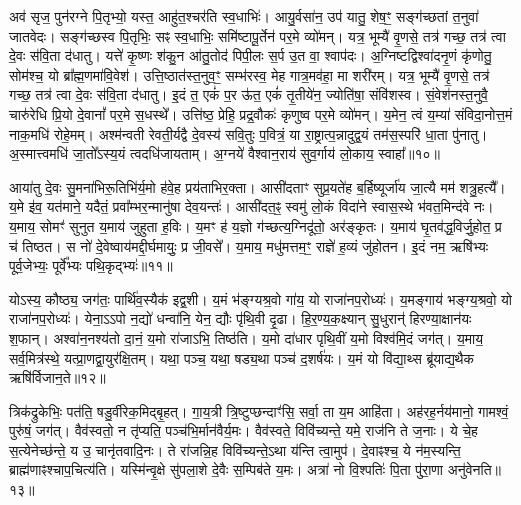 अव॑ सृज॒ पुन॑रग्ने पि॒तृभ्यो॒ यस्त॒ आहु॑त॒श्चर॑ति स्व॒धाभिः॑। 
आयु॒र्वसा॑न॒ उप॑ यातु॒ शेष॒ꣳ॒ सङ्ग॑च्छतां त॒नुवा॑ जातवेदः। 
सङ्ग॑च्छस्व पि॒तृभिः॒ सꣴ स्व॒धाभिः॒ समि॑ष्टापू॒र्तेन॑ पर॒मे व्यो॑मन्। 
यत्र॒ भूम्यै॑ वृ॒णसे॒ तत्र॑ गच्छ॒ तत्र॑ त्वा दे॒वः स॑वि॒ता द॑धातु। 
यत्ते॑ कृ॒ष्णः  श॑कु॒न आ॑तु॒तोद॑ पिपी॒लः स॒र्प उ॒त वा॒ श्वाप॑दः। 
अ॒ग्निष्टद्विश्वा॑दनृ॒णं कृ॑णोतु॒ सोम॑श्च॒ यो ब्रा᳚ह्म॒णमा॑वि॒वेश॑। 
उत्ति॒ष्ठात॑स्त॒नुव॒ꣳ॒ सम्भ॑रस्व॒ मेह गात्र॒मव॑हा॒ मा शरी॑रम्। 
यत्र॒ भूम्यै॑ वृ॒णसे॒ तत्र॑ गच्छ॒ तत्र॑ त्वा दे॒वः स॑वि॒ता द॑धातु। 
इ॒दं त॒ एकं॑ प॒र ऊ॑त॒ एकं॑ तृ॒तीये॑न॒ ज्योति॑षा॒ संवि॑शस्व। 
सं॒वेश॑नस्त॒नुवै॒ चारु॑रेधि प्रि॒यो दे॒वानां᳚ पर॒मे स॒धस्थे᳚। 
उत्ति॑ष्ठ॒ प्रेहि॒ प्रद्र॒वौकः॑ कृणुष्व पर॒मे व्यो॑मन्। 
य॒मेन॒ त्वं य॒म्या॑ संविदा॒नोत्त॒मं नाक॒मधि॑ रोहे॒मम्। 
अश्म॑न्वती रेवती॒र्यद्वै दे॒वस्य॑ सवि॒तुः प॒वित्रं॒ या रा॒ष्ट्रात्प॒न्नादुद्व॒यं तम॑स॒स्परि॑ धा॒ता पु॑नातु। 
अ॒स्मात्त्वमधि॑ जा॒तो᳚ऽस्य॒यं त्वदधि॑जायताम्। 
अ॒ग्नये॑ वैश्वान॒राय॑ सुव॒र्गाय॑ लो॒काय॒ स्वाहा᳚॥१०॥
\anuvakamend[अव॑शीयताꣳ स॒धस्थे॒ पञ्च॑ च]

आया॑तु दे॒वः सु॒मना॑भिरू॒तिभि॑र्य॒मो ह॑वे॒ह प्रय॑ताभिर॒क्ता। 
आसी॑दताꣳ सुप्र॒यते॑ह ब॒र्\mbox{}हिष्यूर्जा॑य जा॒त्यै मम॑ शत्रु॒हत्यै᳚। 
य॒मे इ॑व॒ यत॑माने॒ यदैतं॒ प्रवा᳚म्भर॒न्मानु॑षा देव॒यन्तः॑। 
आसी॑दत॒ꣴ॒ स्वमु॑ लो॒कं  विदा॑ने स्वास॒स्थे भ॑वत॒मिन्द॑वे नः। 
य॒माय॒ सोमꣳ॑ सुनुत य॒माय॑ जुहुता ह॒विः। 
य॒मꣳ ह॑ य॒ज्ञो ग॑च्छत्य॒ग्निदू॑तो॒ अर॑ङ्कृतः। 
य॒माय॑ घृ॒तव॑द्ध॒विर्जु॒होत॒ प्र च॑ तिष्ठत। 
स नो॑ दे॒वेष्वाय॑मद्दी॒र्घमायुः॒ प्र जी॒वसे᳚। 
य॒माय॒ मधु॑मत्तम॒ꣳ॒ राज्ञे॑ ह॒व्यं जु॑होतन। 
इ॒दं नम॒ ऋषि॑भ्यः पूर्व॒जेभ्यः॒ पूर्वे᳚भ्यः पथि॒कृद्भ्यः॑॥११॥

योऽस्य॒ कौष्ठ्य॒ जग॑तः॒ पार्थि॑व॒स्यैक॑ इद्व॒शी। 
य॒मं भ॑ङ्ग्यश्र॒वो गा॑य॒ यो राजा॑नप॒रोध्यः॑। 
य॒मङ्गाय॑ भङ्ग्य॒श्रवो॒ यो राजा॑नप॒रोध्यः॑। 
येना॒ऽऽपो न॒द्यो॑ धन्वा॑नि॒ येन॒ द्यौः पृ॑थि॒वी दृ॒ढा। 
हि॒र॒ण्य॒क॒क्ष्यान् सु॒धुरान्॑ हिरण्या॒क्षान॑यः  श॒फान्। 
अश्वा॑न॒नश्य॑तो दा॒नं॒ य॒मो रा॑जाऽभि॒ तिष्ठ॑ति। 
य॒मो दा॑धार पृथि॒वीं य॒मो विश्व॑मि॒दं जग॑त्। 
य॒माय॒ सर्व॒मित्र॑स्थे॒ यत्प्रा॒णद्वा॒युर॑क्षि॒तम्। 
यथा॒ पञ्च॒ यथा॒ षड्य॒था पञ्च॑ द॒शर्\mbox{}ष॑यः। 
य॒मं यो वि॑द्या॒थ्स ब्रू॑याद्य॒थैक ऋषि॑र्विजान॒ते॥१२॥

त्रिक॑द्रुकेभिः॒ पत॑ति॒ षडु॒र्वीरेक॒मिद्बृ॒हत्। 
गा॒य॒त्री त्रि॒ष्टुप्छन्दाꣳ॑सि॒ सर्वा॒ ता य॒म आहि॑ता। 
अह॑रह॒र्नय॑मानो॒ गामश्वं॒ पुरु॑षं॒ जग॑त्। 
वैव॑स्वतो॒ न तृ॑प्यति॒ पञ्च॑भि॒र्मान॑वैर्य॒मः। 
वैव॑स्वते॒ विवि॑च्यन्ते॒ यमे॒ राज॑नि ते ज॒नाः। 
ये चे॒ह स॒त्येनेच्छ॑न्ते॒ य उ॒ चानृ॑तवादि॒नः। 
ते रा॑जन्नि॒ह विवि॑च्यन्ते॒ऽथा य॑न्ति त्वा॒मुप॑। 
दे॒वाꣴश्च॒ ये न॑म॒स्यन्ति॒ ब्राह्म॑णाꣴश्चाप॒चित्य॑ति। 
यस्मि॑न्वृ॒क्षे सु॑पला॒शे दे॒वैः स॒म्पिब॑ते य॒मः। 
अत्रा॑ नो वि॒श्पतिः॑ पि॒ता पु॑रा॒णा अनु॑वेनति॥१३॥
\anuvakamend[प॒थि॒कृद्भ्यो॑ विजान॒तेऽनु॑ वेनति]

